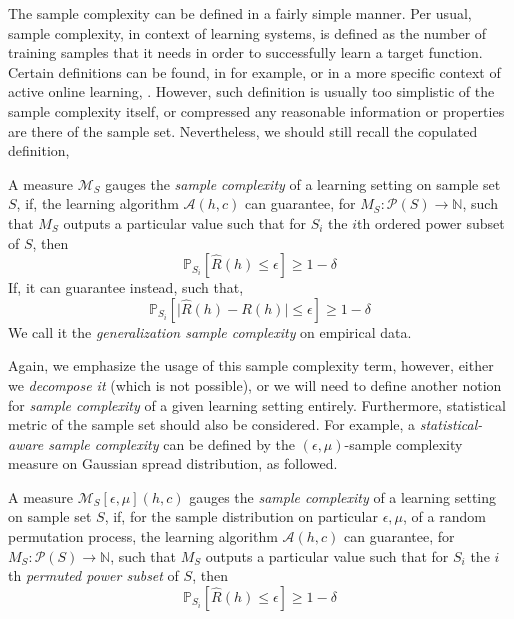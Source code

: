 \documentclass[10pt]{article} %
\begin{document}
The sample complexity can be defined in a fairly simple manner. Per usual, sample complexity, in context of learning systems, is defined as the number of training samples that it needs in order to successfully learn a target function. Certain definitions can be found, in for example, \cite{huang2025samplecomplexityrepresentationability,wegel2025samplecomplexitysemisupervisedmultiobjective,Mei2022TowardsBridging} or in a more specific context of active online learning, \cite{Balcan2010TrueSampleComplexity}.  However, such definition is usually too simplistic of the sample complexity itself, or compressed any reasonable information or properties are there of the sample set. Nevertheless, we should still recall the copulated definition, 
\begin{definition}
  A measure $\mathcal{M}_{S}$ gauges the \textit{sample complexity} of a learning setting on sample set $S$, if, the learning algorithm $\mathcal{A}(h,c)$ can guarantee, for $M_{S}:\mathcal{P}(S)\to\mathbb{N}$, such that $M_{S}$ outputs a particular value such that for $S_{i}$ the $i$th ordered power subset of $S$, then
  \begin{equation}
    \mathbb{P}_{S_{i}} \left[\hat{R}(h)\leq \epsilon\right] \geq 1 - \delta
  \end{equation}
  If, it can guarantee instead, such that, 
  \begin{equation}
    \mathbb{P}_{S_{i}} \left[\lvert \hat{R}(h) - R(h) \rvert\leq \epsilon\right] \geq 1 - \delta
  \end{equation}
  We call it the \textit{generalization sample complexity} on empirical data. 
\end{definition}
Again, we emphasize the usage of this sample complexity term, however, either we \textit{decompose it} (which is not possible), or we will need to define another notion for \textit{sample complexity} of a given learning setting entirely. Furthermore, statistical metric of the sample set should also be considered. For example, a \textit{statistical-aware sample complexity} can be defined by the $(\epsilon,\mu)$-sample complexity measure on Gaussian spread distribution, as followed. 
\begin{definition}
  A measure $\mathcal{M}_{S}[\epsilon,\mu](h,c)$ gauges the \textit{sample complexity} of a learning setting on sample set $S$, if, for the sample distribution on particular $\epsilon,\mu$, of a random permutation process, the learning algorithm $\mathcal{A}(h,c)$ can guarantee, for $M_{S}:\mathcal{P}(S)\to\mathbb{N}$, such that $M_{S}$ outputs a particular value such that for $S_{i}$ the $i$th \textit{permuted power subset} of $S$, then
  \begin{equation}
    \mathbb{P}_{S_{i}} \left[\hat{R}(h)\leq \epsilon\right] \geq 1 - \delta
  \end{equation}
\end{definition}
\end{document}
